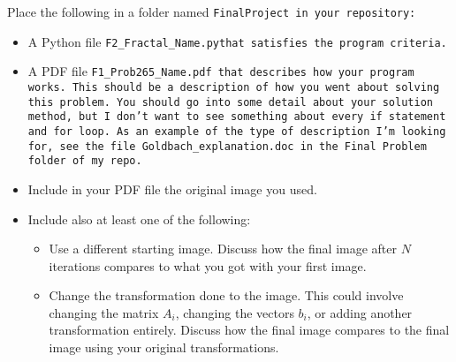 \documentclass{article}
\newcommand\foldername{\tt{FinalProject} }
\newcommand\filename{\tt{F2\_Fractal\_Name.py}\;\;}
\begin{document}
	
	Place the following in a folder named \foldername in your repository:
	\begin{itemize}
		\item A Python file \filename  that satisfies the program criteria.
		\item A PDF file \tt{F1\_Prob265\_Name.pdf} that describes how your program works.  This should be a description of how you went about solving this problem.  You should go into some detail about your solution method, but I don't want to see something about every \tt{if} statement and \tt{for} loop.  As an example of the type of description I'm looking for, see the file \tt{Goldbach\_explanation.doc} in the \tt{Final Problem} folder of my repo.
		\item Include in your PDF file the original image you used.  
		\item Include also at least one of the following:
		\begin{itemize}
			\item Use a different starting image.  Discuss how the final image after $N$ iterations compares to what you got with your first image.
			\item Change the transformation done to the image.  This could involve changing the matrix $A_i$, changing the vectors $b_i$, or adding another transformation entirely.  Discuss how the final image compares to the final image using your original transformations.
		\end{itemize}
	\end{itemize}

	
\end{document}
